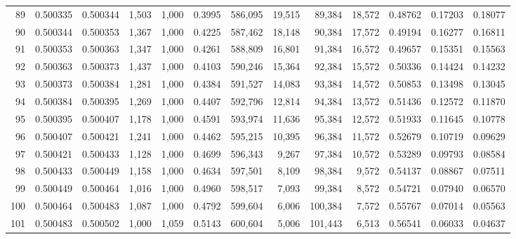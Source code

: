 \begin{tabular}{rrrrrrrrrrrrr}
89  &  0.500335 &  0.500344 &   1,503 &  1,000 &                                     0.3995 &  586,095 &   19,515 &   89,384 &   18,572 &  0.48762 &  0.17203 &  0.18077 \\
90  &  0.500344 &  0.500353 &   1,367 &  1,000 &                                     0.4225 &  587,462 &   18,148 &   90,384 &   17,572 &  0.49194 &  0.16277 &  0.16811 \\
91  &  0.500353 &  0.500363 &   1,347 &  1,000 &                                     0.4261 &  588,809 &   16,801 &   91,384 &   16,572 &  0.49657 &  0.15351 &  0.15563 \\
92  &  0.500363 &  0.500373 &   1,437 &  1,000 &                                     0.4103 &  590,246 &   15,364 &   92,384 &   15,572 &  0.50336 &  0.14424 &  0.14232 \\
93  &  0.500373 &  0.500384 &   1,281 &  1,000 &                                     0.4384 &  591,527 &   14,083 &   93,384 &   14,572 &  0.50853 &  0.13498 &  0.13045 \\
94  &  0.500384 &  0.500395 &   1,269 &  1,000 &                                     0.4407 &  592,796 &   12,814 &   94,384 &   13,572 &  0.51436 &  0.12572 &  0.11870 \\
95  &  0.500395 &  0.500407 &   1,178 &  1,000 &                                     0.4591 &  593,974 &   11,636 &   95,384 &   12,572 &  0.51933 &  0.11645 &  0.10778 \\
96  &  0.500407 &  0.500421 &   1,241 &  1,000 &                                     0.4462 &  595,215 &   10,395 &   96,384 &   11,572 &  0.52679 &  0.10719 &  0.09629 \\
97  &  0.500421 &  0.500433 &   1,128 &  1,000 &                                     0.4699 &  596,343 &    9,267 &   97,384 &   10,572 &  0.53289 &  0.09793 &  0.08584 \\
98  &  0.500433 &  0.500449 &   1,158 &  1,000 &                                     0.4634 &  597,501 &    8,109 &   98,384 &    9,572 &  0.54137 &  0.08867 &  0.07511 \\
99  &  0.500449 &  0.500464 &   1,016 &  1,000 &                                     0.4960 &  598,517 &    7,093 &   99,384 &    8,572 &  0.54721 &  0.07940 &  0.06570 \\
100 &  0.500464 &  0.500483 &   1,087 &  1,000 &                                     0.4792 &  599,604 &    6,006 &  100,384 &    7,572 &  0.55767 &  0.07014 &  0.05563 \\
101 &  0.500483 &  0.500502 &   1,000 &  1,059 &                                     0.5143 &  600,604 &    5,006 &  101,443 &    6,513 &  0.56541 &  0.06033 &  0.04637 \\

\end{tabular}
